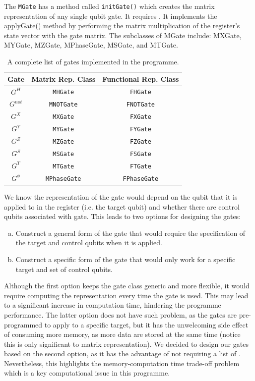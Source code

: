 \documentclass[bibliography=totocnumbered, 10pt]{article}
\theoremstyle{NoticeStyle}
\begin{document}
\begin{myenumerate}
The \texttt{MGate} has a method called \texttt{initGate()} which creates the matrix representation of any single qubit gate. It requires . It implements the applyGate() method by performing the matrix multiplication of the register’s state vector with the gate matrix. The subclasses of MGate include: MXGate, MYGate, MZGate, MPhaseGate, MSGate, and MTGate.

\setlength{\extrarowheight}{3pt}
\begin{table}[h]
\begin{center}
\begin{tabular}{c | c | c}
	Gate & Matrix Rep. Class & Functional Rep. Class \\ \hline
	$G^H$ & \texttt{MHGate} & \texttt{FHGate} \\ 
	$G^{not}$ & \texttt{MNOTGate} & \texttt{FNOTGate} \\
	$G^{X}$ & \texttt{MXGate} & \texttt{FXGate} \\
	$G^{Y}$ & \texttt{MYGate} & \texttt{FYGate} \\
	$G^{Z}$ & \texttt{MZGate} & \texttt{FZGate} \\
	$G^{S}$ & \texttt{MSGate} & \texttt{FSGate} \\
	$G^{T}$ & \texttt{MTGate} & \texttt{FTGate} \\
	$G^{\phi}$ & \texttt{MPhaseGate} & \texttt{FPhaseGate} \\	
\end{tabular}
\caption{A complete list of gates implemented in the programme.}
\end{center}
\end{table}
	We know the representation of the gate would depend on the qubit that it is applied to in the register (i.e. the target qubit) and whether there are control qubits associated with gate. This leads to two options for designing the gates:
\begin{enumerate}[(a)]
	\item Construct a general form of the gate that would require the specification of the target and control qubits when it is applied.
	\item Construct a specific form of the gate that would only work for a specific target and set of control qubits.
\end{enumerate}
Although the first option keeps the gate class generic and more flexible, it would require computing the representation every time the gate is used. This may lead to a significant increase in computation time, hindering the programme performance. The latter option does not have such problem, as the gates are pre-programmed to apply to a specific target, but it has the unwelcoming side effect of consuming more memory, as more data are stored at the same time (notice this is only significant to matrix representation).  We decided to design our gates based on the second option, as it has the advantage of not requiring a list of . Nevertheless, this highlights the memory-computation time trade-off problem which is a key computational issue in this programme.


\end{myenumerate}
\end{document}
